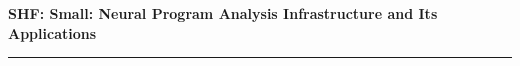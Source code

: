\documentclass[11pt]{article}
\begin{document}
\begin{center}


{\large \bf SHF: Small: Neural Program Analysis Infrastructure and Its Applications}
\end{center}
\vspace{-.1in}
\hrule

%

%


%
%


%


%
%


\newpage
\setcounter{page}{1}




%
\end{document}
